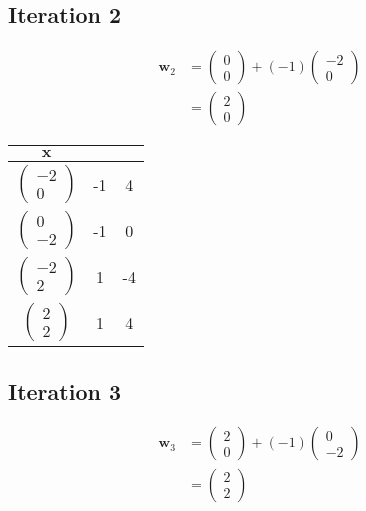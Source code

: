 \documentclass[11pt, a4paper]{article}
\begin{document}
\subsection{Iteration 2}

\begin{align*}
	\boldsymbol{w}_2 & = \begin{pmatrix} 0 \\ 0 \end{pmatrix} + (-1)  \begin{pmatrix} -2 \\ 0 \end{pmatrix}  \\
	                 & = \begin{pmatrix} 2 \\ 0 \end{pmatrix}
\end{align*}

\begin{table}[htbp]
	\centering
	\begin{tabular}{|c|c|c|}
		\toprule
		$\boldsymbol{x}$    \\
		\midrule
		$\begin{pmatrix} -2 \\ 0 \end{pmatrix}$ & -1 & 4 \\
		$\begin{pmatrix} 0  \\ -2 \end{pmatrix}$ & -1 & 0 \\
		$\begin{pmatrix} -2 \\ 2 \end{pmatrix}$ & 1 & -4 \\
		$\begin{pmatrix} 2  \\ 2 \end{pmatrix}$ & 1 & 4 \\
		\hline
	\end{tabular}
\end{table}

\FloatBarrier

\subsection{Iteration 3}

\begin{align*}
	\boldsymbol{w}_3 & = \begin{pmatrix} 2 \\ 0 \end{pmatrix} + (-1)  \begin{pmatrix} 0 \\ -2 \end{pmatrix}  \\
	                 & = \begin{pmatrix} 2 \\ 2 \end{pmatrix}
\end{align*}
\end{document}
